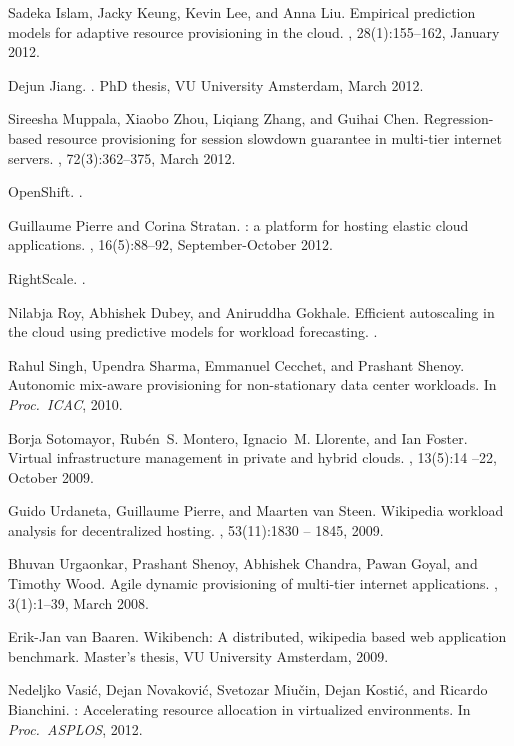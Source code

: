 \documentclass{sig-alternate-10pt}
\begin{document}
\begin{thebibliography}{10}
Sadeka Islam, Jacky Keung, Kevin Lee, and Anna Liu.
\newblock Empirical prediction models for adaptive resource provisioning in the
  cloud.
, 28(1):155--162, January 2012.

Dejun Jiang.
.
\newblock PhD thesis, VU University Amsterdam, March 2012.

Sireesha Muppala, Xiaobo Zhou, Liqiang Zhang, and Guihai Chen.
\newblock Regression-based resource provisioning for session slowdown guarantee
  in multi-tier internet servers.
, 72(3):362--375,
  March 2012.

{OpenShift}.
.

Guillaume Pierre and Corina Stratan.
: a platform for hosting elastic cloud applications.
, 16(5):88--92, September-October 2012.

{RightScale}.
.

Nilabja Roy, Abhishek Dubey, and Aniruddha Gokhale.
\newblock Efficient autoscaling in the cloud using predictive models for
  workload forecasting.
.

Rahul Singh, Upendra Sharma, Emmanuel Cecchet, and Prashant Shenoy.
\newblock Autonomic mix-aware provisioning for non-stationary data center
  workloads.
\newblock In {\em Proc.\ ICAC}, 2010.

Borja Sotomayor, Rub\'en~S. Montero, Ignacio~M. Llorente, and Ian Foster.
\newblock Virtual infrastructure management in private and hybrid clouds.
, 13(5):14 --22, October 2009.

Guido Urdaneta, Guillaume Pierre, and Maarten van Steen.
\newblock Wikipedia workload analysis for decentralized hosting.
, 53(11):1830 -- 1845, 2009.

Bhuvan Urgaonkar, Prashant Shenoy, Abhishek Chandra, Pawan Goyal, and Timothy
  Wood.
\newblock Agile dynamic provisioning of multi-tier internet applications.
, 3(1):1--39, March 2008.

Erik-Jan van Baaren.
\newblock Wikibench: A distributed, wikipedia based web application benchmark.
\newblock Master's thesis, VU University Amsterdam, 2009.

Nedeljko Vasi\'c, Dejan Novakovi\'c, Svetozar Miu\v{c}in, Dejan Kosti\'c, and
  Ricardo Bianchini.
: Accelerating resource allocation in virtualized
  environments.
\newblock In {\em Proc.\ ASPLOS}, 2012.

\end{thebibliography}
\end{document}
